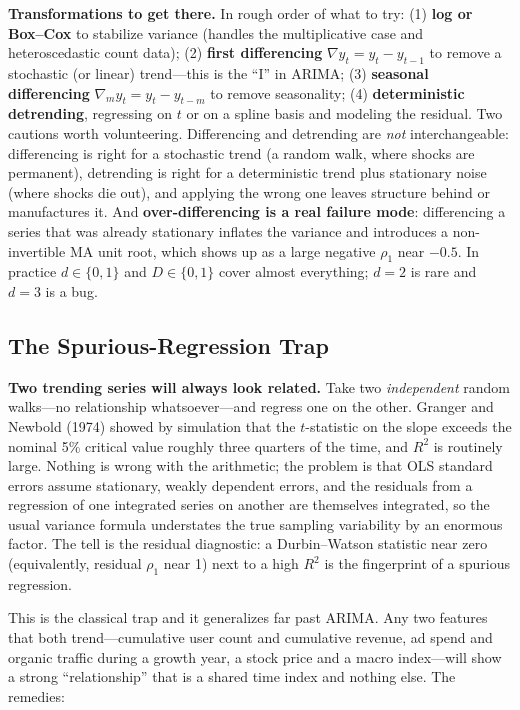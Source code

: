 \textbf{Transformations to get there.} In rough order of what to try: (1) \textbf{log or Box--Cox} to stabilize variance (handles the multiplicative case and heteroscedastic count data); (2) \textbf{first differencing} $\nabla y_t = y_t - y_{t-1}$ to remove a stochastic (or linear) trend---this is the ``I'' in ARIMA; (3) \textbf{seasonal differencing} $\nabla_m y_t = y_t - y_{t-m}$ to remove seasonality; (4) \textbf{deterministic detrending}, regressing on $t$ or on a spline basis and modeling the residual. Two cautions worth volunteering. Differencing and detrending are \emph{not} interchangeable: differencing is right for a stochastic trend (a random walk, where shocks are permanent), detrending is right for a deterministic trend plus stationary noise (where shocks die out), and applying the wrong one leaves structure behind or manufactures it. And \textbf{over-differencing is a real failure mode}: differencing a series that was already stationary inflates the variance and introduces a non-invertible MA unit root, which shows up as a large negative $\rho_1$ near $-0.5$. In practice $d \in \{0,1\}$ and $D \in \{0,1\}$ cover almost everything; $d=2$ is rare and $d=3$ is a bug.

\subsection{The Spurious-Regression Trap}

\begin{warningbox}
\textbf{Two trending series will always look related.} Take two \emph{independent} random walks---no relationship whatsoever---and regress one on the other. Granger and Newbold (1974) showed by simulation that the $t$-statistic on the slope exceeds the nominal 5\% critical value roughly three quarters of the time, and $R^2$ is routinely large. Nothing is wrong with the arithmetic; the problem is that OLS standard errors assume stationary, weakly dependent errors, and the residuals from a regression of one integrated series on another are themselves integrated, so the usual variance formula understates the true sampling variability by an enormous factor. The tell is the residual diagnostic: a Durbin--Watson statistic near zero (equivalently, residual $\rho_1$ near 1) next to a high $R^2$ is the fingerprint of a spurious regression.
\end{warningbox}

This is the classical trap and it generalizes far past ARIMA. Any two features that both trend---cumulative user count and cumulative revenue, ad spend and organic traffic during a growth year, a stock price and a macro index---will show a strong ``relationship'' that is a shared time index and nothing else. The remedies:

